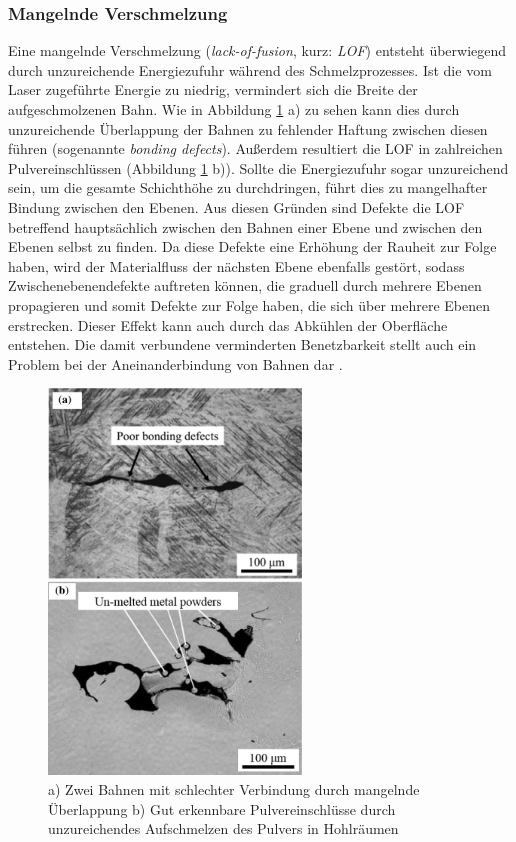 		\subsubsection{Mangelnde Verschmelzung}
		Eine mangelnde Verschmelzung (\emph{lack-of-fusion}, kurz: \emph{LOF}) entsteht
		überwiegend durch unzureichende Energiezufuhr während des Schmelzprozesses. Ist die vom
		Laser zugeführte Energie zu niedrig, vermindert sich die Breite der aufgeschmolzenen Bahn.
		Wie in Abbildung \ref{fig:defects_lof} a) zu sehen kann dies durch unzureichende
		Überlappung der Bahnen zu fehlender Haftung zwischen diesen führen (sogenannte
		\emph{bonding defects}). Außerdem resultiert die LOF in zahlreichen Pulvereinschlüssen
		(Abbildung \ref{fig:defects_lof} b)). Sollte die Energiezufuhr sogar unzureichend sein,
		um die gesamte Schichthöhe zu durchdringen, führt dies zu mangelhafter Bindung zwischen
		den Ebenen. Aus diesen Gründen sind Defekte die LOF betreffend hauptsächlich zwischen
		den Bahnen einer Ebene und zwischen den Ebenen selbst zu finden. Da diese Defekte eine
		Erhöhung der Rauheit zur Folge haben, wird der Materialfluss der nächsten Ebene ebenfalls
		gestört, sodass Zwischenebenendefekte auftreten können, die graduell durch mehrere Ebenen
		propagieren und somit Defekte zur Folge haben, die sich über mehrere Ebenen erstrecken.
		Dieser Effekt kann auch durch das Abkühlen der Oberfläche entstehen. Die damit verbundene
		verminderten Benetzbarkeit stellt auch ein Problem bei der Aneinanderbindung von Bahnen
		dar \cite{zhang2017defect}.

		\begin{figure}[!ht]
			\centering
			\includegraphics[width=0.6\textwidth]{chapter/main/theory/img/defects/lack_of_fusion.png}
			\caption{a) Zwei Bahnen mit schlechter Verbindung durch mangelnde Überlappung
			b) Gut erkennbare Pulvereinschlüsse durch unzureichendes Aufschmelzen des Pulvers
			in Hohlräumen \cite{zhang2017defect}}
			\label{fig:defects_lof}
		\end{figure}

